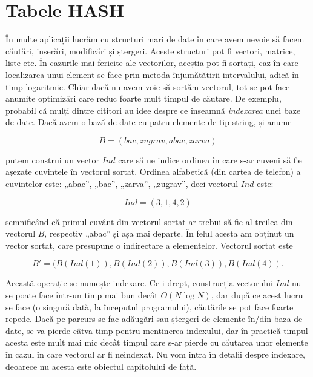 \section{Tabele HASH}

În multe aplicații lucrăm cu structuri mari de date în care avem nevoie să
facem căutări, inserări, modificări și ștergeri. Aceste structuri pot fi
vectori, matrice, liste etc. În cazurile mai fericite ale vectorilor, aceștia
pot fi sortați, caz în care localizarea unui element se face prin metoda
înjumătățirii intervalului, adică în timp logaritmic. Chiar dacă nu avem voie
să sortăm vectorul, tot se pot face anumite optimizări care reduc foarte mult
timpul de căutare. De exemplu, probabil că mulți dintre cititori au idee
despre ce înseamnă {\it indexarea} unei baze de date. Dacă avem o bază de date
cu patru elemente de tip string, și anume

\begin{equation*}
  B = (bac, zugrav, abac, zarva)  
\end{equation*}

putem construi un vector $Ind$ care să ne indice ordinea în care s-ar cuveni
să fie așezate cuvintele în vectorul sortat. Ordinea alfabetică (din cartea de
telefon) a cuvintelor este: „abac”, „bac”, „zarva”, „zugrav”, deci vectorul
$Ind$ este:

\begin{equation*}
  Ind = (3, 1, 4, 2)
\end{equation*}

semnificând că primul cuvânt din vectorul sortat ar trebui să fie al treilea
din vectorul $B$, respectiv „abac” și așa mai departe. În felul acesta am
obținut un vector sortat, care presupune o indirectare a elementelor. Vectorul
sortat este

\begin{equation*}
B' = (B(Ind(1)), B(Ind(2)), B(Ind(3)), B(Ind(4)).
\end{equation*}

Această operație se numește indexare. Ce-i drept, construcția vectorului $Ind$
nu se poate face într-un timp mai bun decât $O(N \log N)$, dar după ce acest
lucru se face (o singură dată, la începutul programului), căutările se pot
face foarte repede. Dacă pe parcurs se fac adăugări sau ștergeri de elemente
în/din baza de date, se va pierde câtva timp pentru menținerea indexului, dar
în practică timpul acesta este mult mai mic decât timpul care s-ar pierde cu
căutarea unor elemente în cazul în care vectorul ar fi neindexat. Nu vom intra
în detalii despre indexare, deoarece nu acesta este obiectul capitolului de
față.

